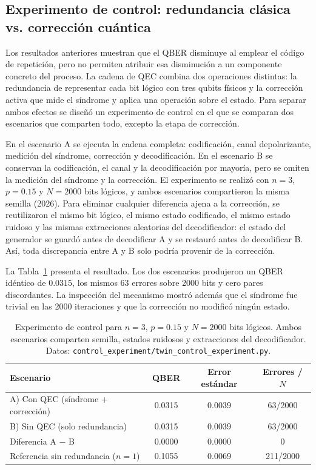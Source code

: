 \documentclass[12pt]{report}
\begin{document}
\subsection{Experimento de control: redundancia clásica vs. corrección cuántica}
\label{sec:control}

Los resultados anteriores muestran que el QBER disminuye al emplear el código de
repetición, pero no permiten atribuir esa disminución a un componente concreto
del proceso. La cadena de QEC combina dos operaciones distintas: la redundancia
de representar cada bit lógico con tres qubits físicos y la corrección activa que
mide el síndrome y aplica una operación sobre el estado. Para separar ambos
efectos se diseñó un experimento de control en el que se comparan dos escenarios
que comparten todo, excepto la etapa de corrección.

En el escenario A se ejecuta la cadena completa: codificación, canal
depolarizante, medición del síndrome, corrección y decodificación. En el
escenario B se conservan la codificación, el canal y la decodificación por
mayoría, pero se omiten la medición del síndrome y la corrección. El experimento
se realizó con \(n=3\), \(p=0.15\) y \(N=2000\) bits lógicos, y ambos escenarios
compartieron la misma semilla (2026). Para eliminar cualquier diferencia ajena a
la corrección, se reutilizaron el mismo bit lógico, el mismo estado codificado,
el mismo estado ruidoso y las mismas extracciones aleatorias del decodificador:
el estado del generador se guardó antes de decodificar A y se restauró antes de
decodificar B. Así, toda discrepancia entre A y B solo podría provenir de la
corrección.

La Tabla~\ref{tab:control} presenta el resultado. Los dos escenarios produjeron un
QBER idéntico de \(0.0315\), los mismos 63 errores sobre 2000 bits y cero pares
discordantes. La inspección del mecanismo mostró además que el síndrome fue
trivial en las 2000 iteraciones y que la corrección no modificó ningún estado.

\begin{table}[htbp]
\centering
\caption{Experimento de control para \(n=3\), \(p=0.15\) y \(N=2000\) bits
lógicos. Ambos escenarios comparten semilla, estados ruidosos y extracciones
del decodificador. Datos:
\texttt{control\_experiment/twin\_control\_experiment.py}.}
\label{tab:control}
\small
\begin{tabular}{@{}lccc@{}}
\toprule
Escenario & QBER & Error estándar & Errores / \(N\) \\
\midrule
A) Con QEC (síndrome + corrección) & 0.0315 & 0.0039 & 63/2000 \\
B) Sin QEC (solo redundancia) & 0.0315 & 0.0039 & 63/2000 \\
Diferencia A \(-\) B & 0.0000 & 0.0000 & 0 \\
\midrule
Referencia sin redundancia (\(n=1\)) & 0.1055 & 0.0069 & 211/2000 \\
\bottomrule
\end{tabular}
\end{table}
\end{document}

